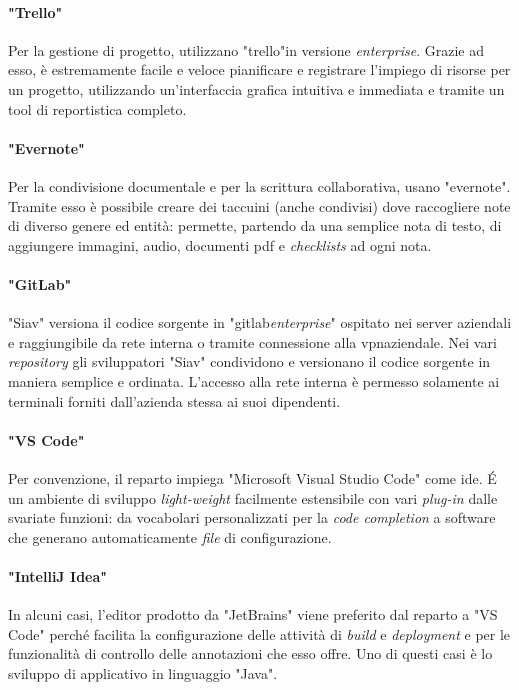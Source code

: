 \paragraph{"Trello"}
Per la gestione di progetto, utilizzano "\gls{trello}"\glsfirstoccur in versione \textit{enterprise}. Grazie ad esso, è estremamente facile e veloce pianificare e registrare l'impiego di risorse per un progetto, utilizzando un'interfaccia grafica intuitiva e immediata e tramite un tool di reportistica completo.

\paragraph{"Evernote"}Per la condivisione documentale e per la scrittura collaborativa, usano "\gls{evernote}"\glsfirstoccur. Tramite esso è possibile creare dei taccuini (anche condivisi) dove raccogliere note di diverso genere ed entità: permette, partendo da una semplice nota di testo, di aggiungere immagini, audio, documenti pdf e \textit{checklists} ad ogni nota.


\paragraph{"GitLab"}"Siav" versiona il codice sorgente in "\gls{gitlab}\glsfirstoccur \textit{enterprise}" ospitato nei server aziendali e raggiungibile da rete interna o tramite connessione alla \acrshort{vpn}\glsfirstoccur aziendale. Nei vari \textit{repository} gli sviluppatori "Siav" condividono e versionano il codice sorgente in maniera semplice e ordinata.
L'accesso alla rete interna è permesso solamente ai terminali forniti dall'azienda stessa ai suoi dipendenti.

\paragraph{"VS Code"} Per convenzione, il reparto impiega "Microsoft Visual Studio Code" come \acrshort{ide}. \'E un ambiente di sviluppo \textit{light-weight} facilmente estensibile con vari \textit{plug-in} dalle svariate funzioni: da vocabolari personalizzati per la \textit{code completion} a software che generano automaticamente \textit{file} di configurazione.

\paragraph{"IntelliJ Idea"} In alcuni casi, l'editor prodotto da "JetBrains" viene preferito dal reparto a "VS Code" perché facilita la configurazione delle attività di \textit{build} e \textit{deployment} e per le funzionalità di controllo delle annotazioni che esso offre. Uno di questi casi è lo sviluppo di applicativo in linguaggio "Java".



